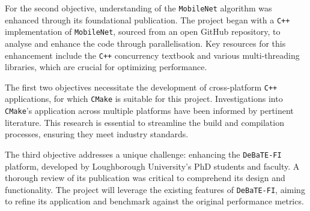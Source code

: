 For the second objective, understanding of the \texttt{MobileNet} algorithm was enhanced through its foundational publication\cite{mobilenet_paper}. The project began with a \texttt{C++} implementation of \texttt{MobileNet}, sourced from an open GitHub repository\cite{mobilenet_repo}, to analyse and enhance the code through parallelisation. Key resources for this enhancement include the \texttt{C++} concurrency textbook\cite{c++_concurrency_in_action} and various multi-threading libraries\cite{openmp_usage_hpc}, which are crucial for optimizing performance.

The first two objectives necessitate the development of cross-platform \texttt{C++} applications, for which \texttt{CMake} is suitable for this project. Investigations into \texttt{CMake}'s application across multiple platforms have been informed by pertinent literature\cite{cmake_publication_1}\cite{cmake_publication_2}. This research is essential to streamline the build and compilation processes, ensuring they meet industry standards.

The third objective addresses a unique challenge: enhancing the \texttt{DeBaTE-FI} platform, developed by Loughborough University’s PhD students and faculty\cite{debate_fi_publication}. A thorough review of its publication was critical to comprehend its design and functionality. The project will leverage the existing features of \texttt{DeBaTE-FI}, aiming to refine its application and benchmark against the original performance metrics. 


